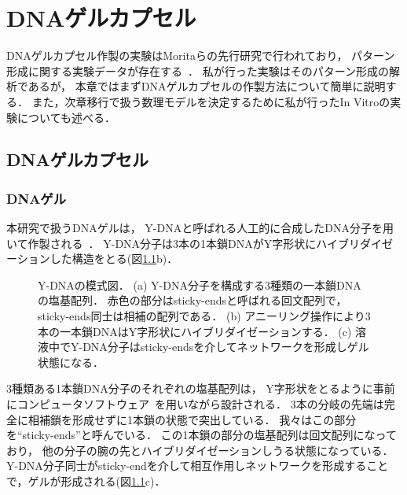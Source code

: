 \chapter{DNAゲルカプセル}
\label{sec:dnagel}

DNAゲルカプセル作製の実験はMoritaらの先行研究で行われており，
パターン形成に関する実験データが存在する~\cite{moritasan}．
私が行った実験はそのパターン形成の解析であるが，
本章ではまずDNAゲルカプセルの作製方法について簡単に説明する．
また，次章移行で扱う数理モデルを決定するために私が行ったIn Vitroの実験についても述べる．

\section{DNAゲルカプセル}

\subsection{DNAゲル}
本研究で扱うDNAゲルは，
Y-DNAと呼ばれる人工的に合成したDNA分子を用いて作製される~\cite{morita2017formation}．
Y-DNA分子は3本の1本鎖DNAがY字形状にハイブリダイゼーションした構造をとる(図\ref{fig:ydna}b)．
\begin{figure}
    \centering
    
    \caption{Y-DNAの模式図．
        (a) Y-DNA分子を構成する3種類の一本鎖DNAの塩基配列．
            赤色の部分はsticky-endsと呼ばれる回文配列で，sticky-ends同士は相補の配列である．
        (b) アニーリング操作により3本の一本鎖DNAはY字形状にハイブリダイゼーションする．
        (c) 溶液中でY-DNA分子はsticky-endsを介してネットワークを形成しゲル状態になる．
    }
    \label{fig:ydna}
\end{figure}
3種類ある1本鎖DNA分子のそれぞれの塩基配列は，
Y字形状をとるように事前にコンピュータソフトウェア~\cite{zadeh2011nupack}を用いながら設計される．
3本の分岐の先端は完全に相補鎖を形成せずに1本鎖の状態で突出している．
我々はこの部分を``sticky-ends''と呼んでいる．
この1本鎖の部分の塩基配列は回文配列になっており，
他の分子の腕の先とハイブリダイゼーションしうる状態になっている．
Y-DNA分子同士がsticky-endを介して相互作用しネットワークを形成することで，ゲルが形成される(図\ref{fig:ydna}c)．

